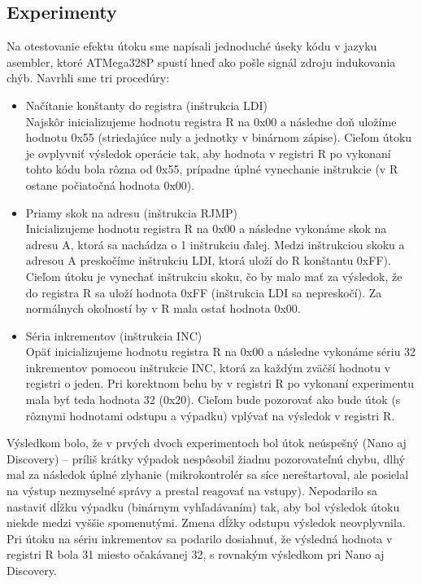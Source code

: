 \subsection{Experimenty}
Na otestovanie efektu útoku sme napísali jednoduché úseky kódu v jazyku asembler, ktoré ATMega328P spustí hneď ako pošle signál zdroju indukovania chýb. Navrhli sme tri procedúry:
\begin{itemize}
    \item Načítanie konštanty do registra (inštrukcia LDI)\\
    Najskôr inicializujeme hodnotu registra R na 0x00 a následne doň uložíme hodnotu 0x55 (striedajúce nuly a jednotky v binárnom zápise). Cieľom útoku je ovplyvniť výsledok operácie tak, aby hodnota v registri R po vykonaní tohto kódu bola rôzna od 0x55, prípadne úplné vynechanie inštrukcie (v R ostane počiatočná hodnota 0x00).
    \item Priamy skok na adresu (inštrukcia RJMP)\\
    Inicializujeme hodnotu registra R na 0x00 a následne vykonáme skok na adresu A, ktorá sa nachádza o 1 inštrukciu ďalej. Medzi inštrukciou skoku a adresou A preskočíme inštrukciu LDI, ktorá uloží do R konštantu 0xFF). Cieľom útoku je vynechať inštrukciu skoku, čo by malo mať za výsledok, že do registra R sa uloží hodnota 0xFF (inštrukcia LDI sa nepreskočí). Za normálnych okolností by v R mala ostať hodnota 0x00.
    \item Séria inkrementov (inštrukcia INC)\\
    Opäť inicializujeme hodnotu registra R na 0x00 a následne vykonáme sériu 32 inkrementov pomocou inštrukcie INC, ktorá za každým zväčší hodnotu v registri o jeden. Pri korektnom behu by v registri R po vykonaní experimentu mala byť teda hodnota 32 (0x20). Cieľom bude pozorovať ako bude útok (s rôznymi hodnotami odstupu a výpadku) vplývať na výsledok v registri R.
\end{itemize}

Výsledkom bolo, že v prvých dvoch experimentoch bol útok neúspešný (Nano aj Discovery) -- príliš krátky výpadok nespôsobil žiadnu pozorovateľnú chybu, dlhý mal za následok úplné zlyhanie (mikrokontrolér sa síce nereštartoval, ale posielal na výstup nezmyselné správy a prestal reagovať na vstupy). Nepodarilo sa nastaviť dĺžku výpadku (binárnym vyhľadávaním) tak, aby bol výsledok útoku niekde medzi vyššie spomenutými. Zmena dĺžky odstupu výsledok neovplyvnila. Pri útoku na sériu inkrementov sa podarilo dosiahnuť, že výsledná hodnota v registri R bola 31 miesto očakávanej 32, s rovnakým výsledkom pri Nano aj Discovery.

